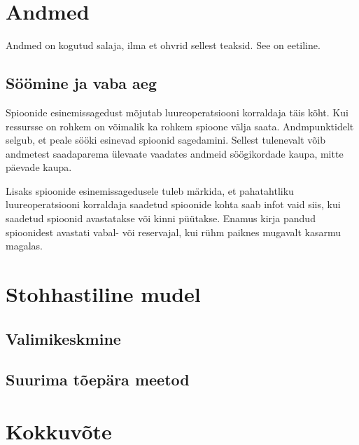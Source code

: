 \documentclass{article}
\theoremstyle{definition}
\begin{document}
\section{Andmed}
Andmed on kogutud salaja, ilma et ohvrid sellest teaksid. See on eetiline.

\subsection{Söömine ja vaba aeg}
Spioonide esinemissagedust mõjutab luureoperatsiooni korraldaja täis kõht. Kui ressursse on rohkem on võimalik ka rohkem spioone välja saata. Andmpunktidelt selgub, et peale sööki esinevad spioonid sagedamini. Sellest tulenevalt võib andmetest saadaparema ülevaate vaadates andmeid söögikordade kaupa, mitte päevade kaupa.

Lisaks spioonide esinemissagedusele tuleb märkida, et pahatahtliku luureoperatsiooni korraldaja saadetud spioonide kohta saab infot vaid siis, kui saadetud spioonid avastatakse või kinni püütakse. Enamus kirja pandud spioonidest avastati vabal- või reservajal, kui rühm paiknes mugavalt kasarmu magalas.

\section{Stohhastiline mudel}

\subsection{Valimikeskmine}

\subsection{Suurima tõepära meetod}

\section{Kokkuvõte}

\printbibliography[title={Kasutatud allikad}]
\end{document}
